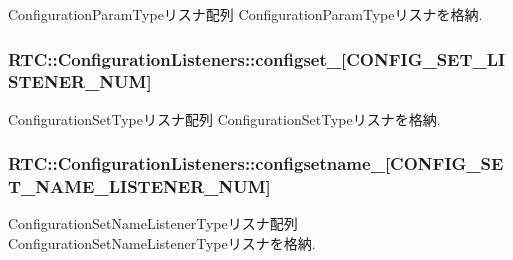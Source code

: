 ConfigurationParamTypeリスナ配列 ConfigurationParamTypeリスナを格納. 

\subsubsection[{configset\_\-}]{ {\bf RTC::ConfigurationListeners::configset\_\-}[CONFIG\_\-SET\_\-LISTENER\_\-NUM]}\label{classRTC_1_1ConfigurationListeners_a9a02da65a4ffc46ff163fd254e1cf95b}


ConfigurationSetTypeリスナ配列 ConfigurationSetTypeリスナを格納. 

\subsubsection[{configsetname\_\-}]{ {\bf RTC::ConfigurationListeners::configsetname\_\-}[CONFIG\_\-SET\_\-NAME\_\-LISTENER\_\-NUM]}\label{classRTC_1_1ConfigurationListeners_af6841756935a113ae387ba212daba655}


ConfigurationSetNameListenerTypeリスナ配列 ConfigurationSetNameListenerTypeリスナを格納. 

